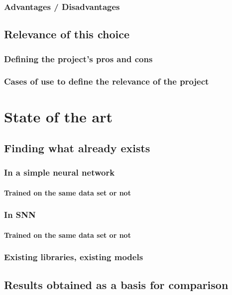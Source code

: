 \documentclass{article}
\begin{document}
        \subsubsection{Advantages / Disadvantages}
    \subsection{Relevance of this choice}
        \subsubsection{Defining the project's pros and cons}
        \subsubsection{Cases of use to define the relevance of the project}

\section{State of the art}
        \subsection{Finding what already exists}
            \subsubsection{In a simple neural network}
                \paragraph{Trained on the same data set or not}
            \subsubsection{In SNN}
                \paragraph{Trained on the same data set or not}
            \subsubsection{Existing libraries, existing models}
        \subsection{Results obtained as a basis for comparison}
    
\end{document}
